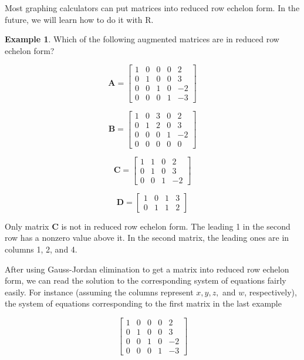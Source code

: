 \documentclass[
]{book}
\theoremstyle{definition}
\theoremstyle{definition}
\newtheorem{example}{Example}[chapter]
\theoremstyle{definition}
\theoremstyle{definition}
\theoremstyle{remark}
\begin{document}
Most graphing calculators can put matrices into reduced row echelon form. In the future, we will learn how to do it with R.

\begin{examplebox}

\begin{example}
Which of the following augmented matrices are in reduced row echelon form?

\[\mathbf{A}=\left[\begin{array}{rrrr|r}
1 & 0 & 0 & 0 & 2\\
0 & 1 & 0 & 0 & 3\\
0 & 0 & 1 & 0 & -2\\
0 & 0 & 0 & 1 & -3\end{array}\right] \]

\[\mathbf{B}=\left[\begin{array}{rrrr|r}
1 & 0 & 3 & 0 & 2\\
0 & 1 & 2 & 0 & 3\\
0 & 0 & 0 & 1 & -2\\
0 & 0 & 0 & 0 & 0\end{array}\right] \]

\[\mathbf{C}=\left[\begin{array}{rrr|r}
1 & 1 & 0 &  2\\
0 & 1 & 0 &  3\\
0 & 0 &  1 &  -2\end{array}\right] \]

\[\mathbf{D}=\left[\begin{array}{rrr|r}
1 & 0 & 1 & 3\\
0 & 1 & 1 & 2\end{array}\right] \]

Only matrix \(\mathbf{C}\) is not in reduced row echelon form. The leading 1 in the second row has a nonzero value above it. In the second matrix, the leading ones are in columns 1, 2, and 4.
\end{example}

\end{examplebox}

After using Gauss-Jordan elimination to get a matrix into reduced row echelon form, we can read the solution to the corresponding system of equations fairly easily. For instance (assuming the columns represent \(x,y,z,\) and \(w\), respectively), the system of equations corresponding to the first matrix in the last example

\[\left[\begin{array}{rrrr|r}
1 & 0 & 0 & 0 & 2\\
0 & 1 & 0 & 0 & 3\\
0 & 0 & 1 & 0 & -2\\
0 & 0 & 0 & 1 & -3\end{array}\right] \]
\end{document}
